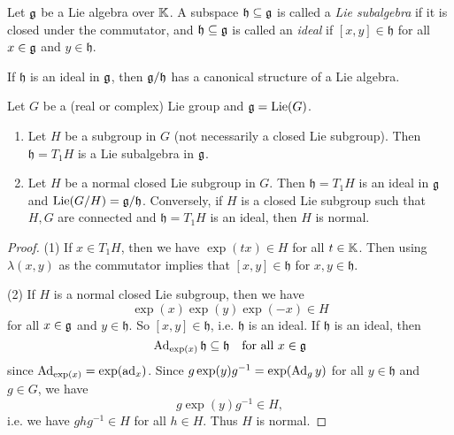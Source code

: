 \begin{definition}
  Let $\mathfrak{g}$ be a Lie algebra over $\mathbb{K}$.
  A subspace $\mathfrak{h} \subseteq \mathfrak{g}$
  is called a \emph{Lie subalgebra}
  if it is closed under the commutator,
  and $\mathfrak{h} \subseteq \mathfrak{g}$
  is called an \emph{ideal} if
  $[x, y] \in \mathfrak{h}$
  for all $x \in \mathfrak{g}$ and
  $y \in \mathfrak{h}$.
\end{definition}

\begin{corollary}
  If $\mathfrak{h}$ is an ideal in
  $\mathfrak{g}$, then
  $\mathfrak{g} / \mathfrak{h}$ has a canonical
  structure of a Lie algebra.
\end{corollary}

\begin{theorem}
  Let $G$ be a (real or complex)
  Lie group and $\mathfrak{g} = \operatorname{Lie}(G)$.
  \begin{enumerate}
    \item Let $H$ be a subgroup in $G$
      (not necessarily a closed Lie
      subgroup). Then
      $\mathfrak{h} = T_1 H$
      is a Lie subalgebra in $\mathfrak{g}$.
    \item Let $H$ be a normal closed
      Lie subgroup in $G$. Then
      $\mathfrak{h} = T_1 H$ is an ideal
      in $\mathfrak{g}$ and
      $\operatorname{Lie}(G / H) = \mathfrak{g} / \mathfrak{h}$.
      Conversely, if $H$ is a closed
      Lie subgroup such that
      $H, G$ are connected and
      $\mathfrak{h} = T_1 H$ is an ideal,
      then $H$ is normal.
  \end{enumerate}
\end{theorem}

\begin{proof}
  (1) If $x \in T_1 H$, then we have
  $\exp(tx) \in H$ for all $t \in \mathbb{K}$.
  Then using $\lambda(x, y)$ as the
  commutator implies that
  $[x, y] \in \mathfrak{h}$ for
  $x, y \in \mathfrak{h}$.

  (2) If $H$ is a normal closed
  Lie subgroup, then we have
  \[
    \exp(x) \exp(y) \exp(-x) \in H
  \]
  for all $x \in \mathfrak{g}$ and $y \in \mathfrak{h}$.
  So $[x, y] \in \mathfrak{h}$, i.e.
  $\mathfrak{h}$ is an ideal.
  If $\mathfrak{h}$ is an ideal, then
  \[
    \operatorname{Ad}_{\exp(x)} \mathfrak{h}
    \subseteq \mathfrak{h}
    \quad \text{for all $x \in \mathfrak{g}$}
  \]
  since $\operatorname{Ad}_{\exp(x)} = \exp(\operatorname{ad}_x)$.
  Since $g \exp(y) g^{-1} = \exp(\operatorname{Ad}_g y)$
  for all $y \in \mathfrak{h}$
  and $g \in G$, we have
  \[g \exp(y) g^{-1} \in H,\]
  i.e. we have
  $g h g^{-1} \in H$ for all $h \in H$.
  Thus $H$ is normal.
\end{proof}


